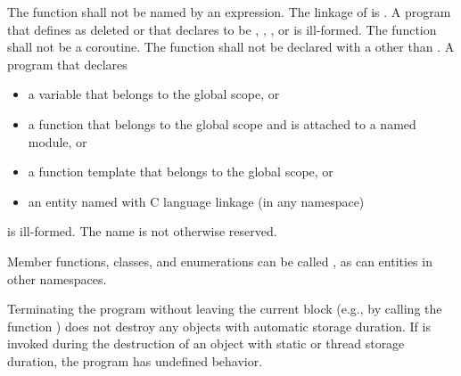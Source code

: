 \pnum
The function  shall not be named by an expression.
%
The linkage of  is
. A program that defines  as
deleted or that declares  to be
, , , or  is ill-formed.
The function  shall not be a coroutine.
The  function shall not be declared with a
 other than .
A program that declares
\begin{itemize}
\item
a variable  that belongs to the global scope, or
\item
a function  that belongs to the global scope and
is attached to a named module, or
\item
a function template  that belongs to the global scope, or
\item
an entity named 
with C language linkage (in any namespace)
\end{itemize}
is ill-formed.
The name  is
not otherwise reserved.
\begin{example}
Member functions, classes, and
enumerations can be called , as can entities in other
namespaces.
\end{example}

\pnum
{}%
%
%
Terminating the program
without leaving the current block (e.g., by calling the function
) does not destroy any
objects with automatic storage duration. If
 is invoked during the destruction of
an object with static or thread storage duration, the program has undefined
behavior.
%
%
%
%
%

